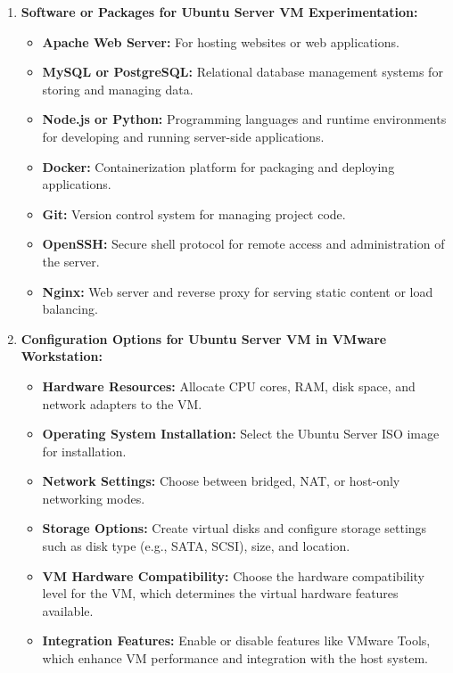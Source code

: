 \documentclass[11pt]{article}
\begin{document}
\begin{enumerate}
    \item \textbf{Software or Packages for Ubuntu Server VM Experimentation:}
          \begin{itemize}
              \item \textbf{Apache Web Server:} For hosting websites or web applications.
              \item \textbf{MySQL or PostgreSQL:} Relational database management systems for storing and managing data.
              \item \textbf{Node.js or Python:} Programming languages and runtime environments for developing and running server-side applications.
              \item \textbf{Docker:} Containerization platform for packaging and deploying applications.
              \item \textbf{Git:} Version control system for managing project code.
              \item \textbf{OpenSSH:} Secure shell protocol for remote access and administration of the server.
              \item \textbf{Nginx:} Web server and reverse proxy for serving static content or load balancing.
          \end{itemize}

    \item \textbf{Configuration Options for Ubuntu Server VM in VMware Workstation:}
          \begin{itemize}
              \item \textbf{Hardware Resources:} Allocate CPU cores, RAM, disk space, and network adapters to the VM.
              \item \textbf{Operating System Installation:} Select the Ubuntu Server ISO image for installation.
              \item \textbf{Network Settings:} Choose between bridged, NAT, or host-only networking modes.
              \item \textbf{Storage Options:} Create virtual disks and configure storage settings such as disk type (e.g., SATA, SCSI), size, and location.
              \item \textbf{VM Hardware Compatibility:} Choose the hardware compatibility level for the VM, which determines the virtual hardware features available.
              \item \textbf{Integration Features:} Enable or disable features like VMware Tools, which enhance VM performance and integration with the host system.
          \end{itemize}


\end{enumerate}
\end{document}
